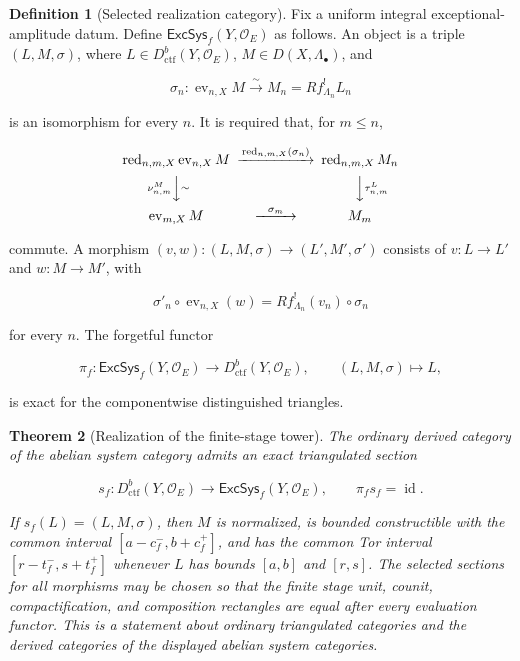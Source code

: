 \documentclass[10pt]{article}
\newtheorem{theorem}{Theorem}[section]
\theoremstyle{definition}
\newtheorem{definition}[theorem]{Definition}
\newcommand{\OO}{\mathcal O}
\newcommand{\Dctf}{D^b_{\mathrm{ctf}}}
\newcommand{\red}{\operatorname{red}}
\begin{document}
\begin{definition}[Selected realization category]
Fix a uniform integral exceptional-amplitude datum.  Define
\(\mathsf{ExcSys}_f(Y,\OO_E)\) as follows.  An object is a triple
\((L,M,\sigma)\), where \(L\in\Dctf(Y,\OO_E)\),
\(M\in D(X,\Lambda_\bullet)\), and

\[
 \sigma_{n}:\operatorname{ev}_{n,X}M\xrightarrow{\sim}M_n
 =Rf^!_{\Lambda_n}L_n
\]

is an isomorphism for every \(n\).  It is required that, for \(m\leq n\),

\[
\begin{CD}
\red_{n,m,X}\operatorname{ev}_{n,X}M
 @>{\red_{n,m,X}(\sigma_n)}>>\red_{n,m,X}M_n\\
@V{\nu^M_{n,m}}V{\sim}V @VV{\tau^L_{n,m}}V\\
\operatorname{ev}_{m,X}M @>{\sigma_m}>>M_m
\end{CD}
\]

commute.  A morphism
\((v,w):(L,M,\sigma)\to(L',M',\sigma')\) consists of
\(v:L\to L'\) and \(w:M\to M'\), with

\[
 \sigma'_n\circ\operatorname{ev}_{n,X}(w)
 =Rf^!_{\Lambda_n}(v_n)\circ\sigma_n
\]

for every \(n\).  The forgetful functor

\[
 \pi_f:\mathsf{ExcSys}_f(Y,\OO_E)\longrightarrow\Dctf(Y,\OO_E),
 \qquad(L,M,\sigma)\longmapsto L,
\]

is exact for the componentwise distinguished triangles.
\end{definition}

\begin{theorem}[Realization of the finite-stage tower]
The ordinary derived category of the abelian system category admits an exact
triangulated section

\[
 s_f:\Dctf(Y,\OO_E)\longrightarrow\mathsf{ExcSys}_f(Y,\OO_E),
 \qquad \pi_fs_f=\operatorname{id}.
\]

If \(s_f(L)=(L,M,\sigma)\), then \(M\) is normalized, is bounded
constructible with the common interval
\([a-c_f^-,b+c_f^+]\), and has the common Tor interval
\([r-t_f^-,s+t_f^+]\) whenever \(L\) has bounds \([a,b]\) and \([r,s]\).
The selected sections for all morphisms may be chosen so that the finite
stage unit, counit, compactification, and composition rectangles are equal
after every evaluation functor.  This is a statement about ordinary
triangulated categories and the derived categories of the displayed abelian
system categories.
\end{theorem}
\end{document}
